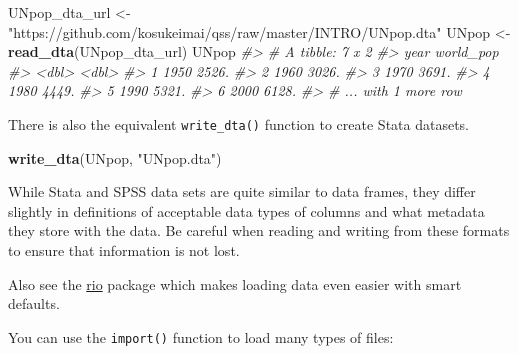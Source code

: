 \documentclass[]{book}
\newenvironment{Shaded}{\begin{snugshade}}{\end{snugshade}}
\newcommand{\KeywordTok}[1]{\textcolor[rgb]{0.13,0.29,0.53}{\textbf{#1}}}
\newcommand{\StringTok}[1]{\textcolor[rgb]{0.31,0.60,0.02}{#1}}
\newcommand{\CommentTok}[1]{\textcolor[rgb]{0.56,0.35,0.01}{\textit{#1}}}
\newcommand{\NormalTok}[1]{#1}
\theoremstyle{definition}
\theoremstyle{definition}
\theoremstyle{definition}
\theoremstyle{remark}
\begin{document}
\begin{Shaded}
\begin{Highlighting}[]
\NormalTok{UNpop_dta_url <-}\StringTok{ "https://github.com/kosukeimai/qss/raw/master/INTRO/UNpop.dta"}
\NormalTok{UNpop <-}\StringTok{ }\KeywordTok{read_dta}\NormalTok{(UNpop_dta_url)}
\NormalTok{UNpop}
\CommentTok{#> # A tibble: 7 x 2}
\CommentTok{#>    year world_pop}
\CommentTok{#>   <dbl>     <dbl>}
\CommentTok{#> 1  1950     2526.}
\CommentTok{#> 2  1960     3026.}
\CommentTok{#> 3  1970     3691.}
\CommentTok{#> 4  1980     4449.}
\CommentTok{#> 5  1990     5321.}
\CommentTok{#> 6  2000     6128.}
\CommentTok{#> # ... with 1 more row}
\end{Highlighting}
\end{Shaded}

There is also the equivalent \texttt{write\_dta()} function to create
Stata datasets.

\begin{Shaded}
\begin{Highlighting}[]
\KeywordTok{write_dta}\NormalTok{(UNpop, }\StringTok{"UNpop.dta"}\NormalTok{)}
\end{Highlighting}
\end{Shaded}

While Stata and SPSS data sets are quite similar to data frames, they
differ slightly in definitions of acceptable data types of columns and
what metadata they store with the data. Be careful when reading and
writing from these formats to ensure that information is not lost.

Also see the \href{https://cran.r-project.org/package=rio}{rio} package
which makes loading data even easier with smart defaults.

You can use the \texttt{import()} function to load many types of files:
\end{document}
